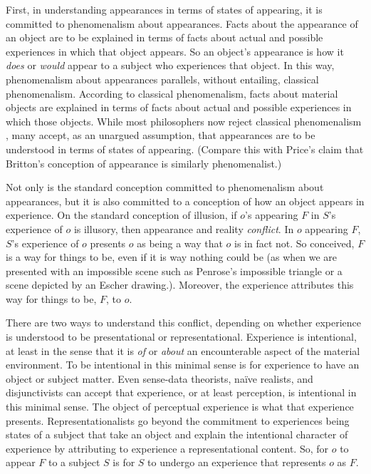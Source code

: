 \documentclass[12pt]{article}
\begin{document}
First, in understanding appearances in terms of states of appearing, it is committed to phenomenalism about appearances. Facts about the appearance of an object are to be explained in terms of facts about actual and possible experiences in which that object appears. So an object's appearance is how it \emph{does} or \emph{would} appear to a subject who experiences that object. In this way, phenomenalism about appearances parallels, without entailing, classical phenomenalism. According to classical phenomenalism, facts about material objects are explained in terms of facts about actual and possible experiences in which those objects. While most philosophers now reject classical phenomenalism \citep[though see][]{Foster:00ny}, many accept, as an unargued assumption, that appearances are to be understood in terms of states of appearing. (Compare this with Price's \citeyear{Price:1952ix} claim that Britton's \citeyear{Britton:1926zm} conception of appearance is similarly phenomenalist.)

Not only is the standard conception committed to phenomenalism about appearances, but it is also committed to a conception of how an object appears in experience. On the standard conception of illusion, if \( o \)'s appearing \( F \) in \( S \)'s experience of \( o \) is illusory, then appearance and reality \emph{conflict}. In \( o \) appearing \( F \), \( S \)'s experience of \( o \) presents \( o \) as being a way that \( o \) is in fact not. So conceived, \( F \) is a way for things to be, even if it is way nothing could be (as when we are presented with an impossible scene such as Penrose's \citeyear{Penrose:1958kx} impossible triangle or a scene depicted by an Escher drawing.). Moreover, the experience attributes this way for things to be, \( F \), to \( o \).

There are two ways to understand this conflict, depending on whether experience is understood to be presentational or representational. Experience is intentional, at least in the sense that it is \emph{of} or \emph{about} an encounterable aspect of the material environment. To be intentional in this minimal sense is for experience to have an object or subject matter. Even sense-data theorists, naïve realists, and disjunctivists can accept that experience, or at least perception, is intentional in this minimal sense. The object of perceptual experience is what that experience presents. Representationalists go beyond the commitment to experiences being states of a subject that take an object and explain the intentional character of experience by attributing to experience a representational content. So, for \( o \) to appear \( F \) to a subject \( S \) is for \( S \) to undergo an experience that represents \( o \) as \( F \). 
\end{document}
